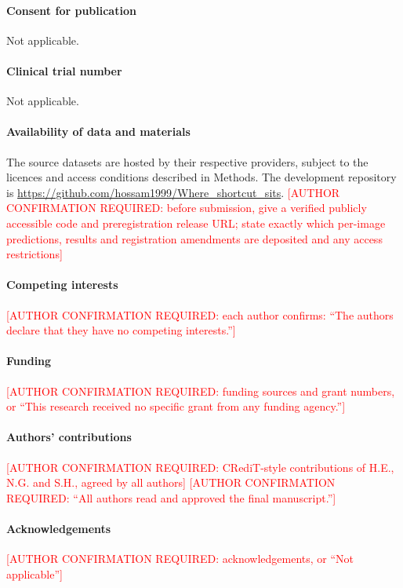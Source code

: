 \documentclass[12pt]{article}
\newcommand{\confirm}[1]{\textcolor{red}{[AUTHOR CONFIRMATION REQUIRED: #1]}}
\begin{document}
\paragraph{Consent for publication} Not applicable.
\paragraph{Clinical trial number} Not applicable.
\paragraph{Availability of data and materials} The source datasets are hosted by their respective providers,
subject to the licences and access conditions described in Methods. The development repository is
\url{https://github.com/hossam1999/Where_shortcut_sits}.
\confirm{before submission, give a verified publicly accessible code and preregistration release URL;
state exactly which per-image predictions, results and registration amendments are deposited and any access restrictions}
\paragraph{Competing interests} \confirm{each author confirms: ``The authors declare that they have no competing
interests.''}
\paragraph{Funding} \confirm{funding sources and grant numbers, or ``This research received no specific grant from any
funding agency.''}
\paragraph{Authors' contributions} \confirm{CRediT-style contributions of H.E., N.G. and S.H., agreed by all authors}
\confirm{``All authors read and approved the final manuscript.''}
\paragraph{Acknowledgements} \confirm{acknowledgements, or ``Not applicable''}


\end{document}
